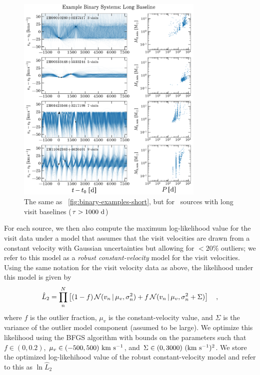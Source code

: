 \documentclass[modern]{aastex63}
\begin{document}
\begin{figure}[!t]
    \begin{center}
    \includegraphics[width=0.8\textwidth]{example-binaries-long.pdf}
    \end{center}
    \caption{%
    The same as \figurename~\ref{fig:binary-examples-short}, but for \apogee\
    sources with long visit baselines ($\tau > 1000~\mathrm{d}$)
    \label{fig:binary-examples-long}
    }
\end{figure}

For each source, we then also compute the maximum log-likelihood value for the
visit data under a model that assumes that the visit velocities are drawn from a
constant velocity with Gaussian uncertainties but allowing for $<20\%$ outliers;
we refer to this model as a \emph{robust constant-velocity} model for the visit
velocities.
Using the same notation for the visit velocity data as above, the likelihood
under this model is given by
\begin{equation}
    \hat{L}_2 = \prod_n^N \left[(1-f) \,
        \mathcal{N}(v_n \given \mu_v, \sigma_n^2)
        + f\, \mathcal{N}(v_n \given \mu_v, \sigma_n^2 + \Sigma) \right] \quad ,
\end{equation}
where $f$ is the outlier fraction, $\mu_v$ is the constant-velocity value, and
$\Sigma$ is the variance of the outlier model component (assumed to be large).
We optimize this likelihood using the BFGS algorithm \citep{Nocedal:2006} with
bounds on the parameters such that $f \in (0, 0.2)$, $\mu_v \in (-500,
500)~\mathrm{km}~\mathrm{s}^{-1}$, and $\Sigma \in (0, 3000)~(\mathrm{km}~\mathrm{s}^{-1})^2$.
We store the optimized log-likehihood value of the robust constant-velocity
model and refer to this as $\ln \hat{L}_2$
\end{document}
